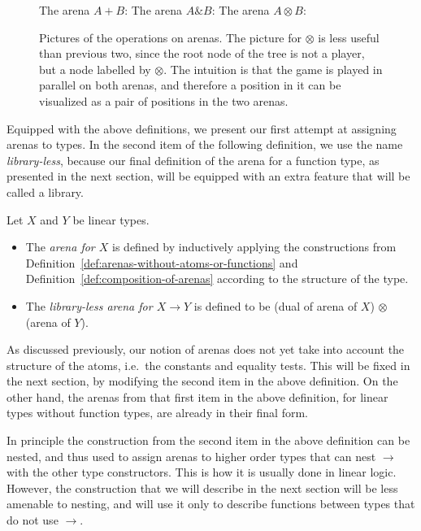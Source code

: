 \begin{figure}
The arena $A+ B$:
The arena $A \& B$: 
The arena $A \otimes B$:
    \caption{\label{fig:arena-constructors} Pictures of the operations on arenas. The picture for $\otimes$  is less useful than previous two, since the root node of the tree is not a player, but a node labelled by $\otimes$. The intuition is that the game is played in parallel on both arenas, and therefore a position in it can be visualized as a pair of positions in the two arenas.}
\end{figure}


        
Equipped with the above definitions, we  present our first attempt at assigning arenas to types. In the second item of the following definition, we use the name \emph{library-less}, because our final definition of the arena for a function type, as presented in the next section, will be equipped with an extra feature that will be called a library. 

\begin{definition} Let $X$ and $Y$ be linear types.
    \begin{itemize}
        \item The \emph{arena for  $X$} is defined by inductively applying the constructions from Definition~\ref{def:arenas-without-atoms-or-functions} and Definition~\ref{def:composition-of-arenas} according to the structure of the type.
        \item The \emph{library-less arena for $X \to Y$} is defined to be (dual of arena of $X$) $\otimes$ (arena of $Y$).
    \end{itemize}
\end{definition}

As discussed previously, our notion of arenas does not yet take into account the structure of the atoms, i.e.~the constants and equality tests. This will be fixed in the next section, by modifying the second item in the above definition. On the other hand, the arenas from that first item in the above definition, for linear types without function types, are already in their final form. 

In principle the construction from the second item in the above definition can be nested, and thus used to assign arenas to higher order types that can nest $\to$ with the other type constructors. This is how it is usually done in linear logic. However,  the construction that we will describe in the next section will  be less amenable to nesting, and will use it only  to describe functions between types that do not use $\to$.


